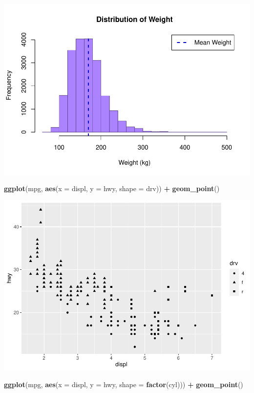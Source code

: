 \documentclass[
]{book}
\newenvironment{Shaded}{\begin{snugshade}}{\end{snugshade}}
\newcommand{\DataTypeTok}[1]{\textcolor[rgb]{0.13,0.29,0.53}{#1}}
\newcommand{\KeywordTok}[1]{\textcolor[rgb]{0.13,0.29,0.53}{\textbf{#1}}}
\newcommand{\NormalTok}[1]{#1}
\newcommand{\OperatorTok}[1]{\textcolor[rgb]{0.81,0.36,0.00}{\textbf{#1}}}
\newcommand{\StringTok}[1]{\textcolor[rgb]{0.31,0.60,0.02}{#1}}
\begin{document}
\includegraphics{_main_files/figure-latex/unnamed-chunk-252-1.pdf}

\begin{Shaded}
\begin{Highlighting}[]
\KeywordTok{ggplot}\NormalTok{(mpg, }\KeywordTok{aes}\NormalTok{(}\DataTypeTok{x =}\NormalTok{ displ, }\DataTypeTok{y =}\NormalTok{ hwy, }\DataTypeTok{shape =}\NormalTok{ drv)) }\OperatorTok{+}\StringTok{ }\KeywordTok{geom_point}\NormalTok{()}
\end{Highlighting}
\end{Shaded}

\includegraphics{_main_files/figure-latex/unnamed-chunk-252-2.pdf}

\begin{Shaded}
\begin{Highlighting}[]
\KeywordTok{ggplot}\NormalTok{(mpg, }\KeywordTok{aes}\NormalTok{(}\DataTypeTok{x =}\NormalTok{ displ, }\DataTypeTok{y =}\NormalTok{ hwy, }\DataTypeTok{shape =} \KeywordTok{factor}\NormalTok{(cyl))) }\OperatorTok{+}\StringTok{ }\KeywordTok{geom_point}\NormalTok{()}
\end{Highlighting}
\end{Shaded}
\end{document}
